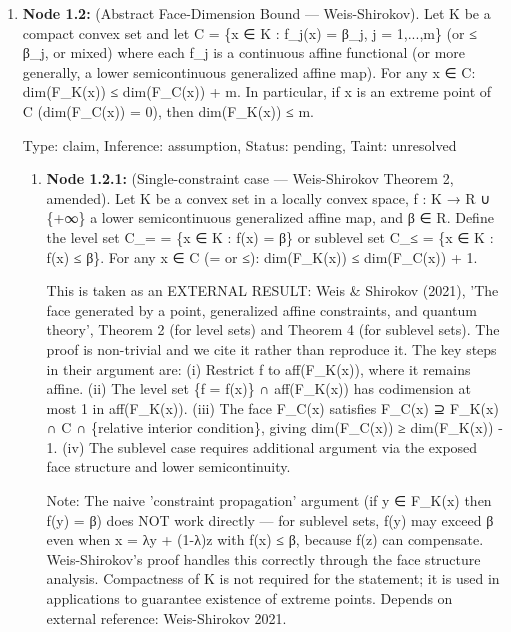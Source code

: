 \documentclass{article}
\begin{document}
\begin{enumerate}
\begin{enumerate}
Note: Faithfulness of f on π\_φ(A)'\textasciicircum{}+ (equivalently, ξ\_φ being separating for π\_φ(A)') is NOT required for this dimension formula — it suffices that f is a non-zero linear functional on V and the cone has interior. Faithfulness is used elsewhere (injectivity, Node 1.1.4).

Combining with Nodes 1.1.1–1.1.5: dim(F\_\{S(A)\}(φ)) = dim(D) = dim\_R(π\_φ(A)'\textasciicircum{}\{sa\}) - 1. This is a deduction depending on Nodes 1.1.1–1.1.5.

  Type: claim, Inference: assumption, Status: pending, Taint: unresolved

\end{enumerate}
\item \textbf{Node 1.2:} (Abstract Face-Dimension Bound — Weis-Shirokov). Let K be a compact convex set and let C = \{x ∈ K : f\_j(x) = β\_j, j = 1,...,m\} (or ≤ β\_j, or mixed) where each f\_j is a continuous affine functional (or more generally, a lower semicontinuous generalized affine map). For any x ∈ C: dim(F\_K(x)) ≤ dim(F\_C(x)) + m. In particular, if x is an extreme point of C (dim(F\_C(x)) = 0), then dim(F\_K(x)) ≤ m.

  Type: claim, Inference: assumption, Status: pending, Taint: unresolved

\begin{enumerate}
\item \textbf{Node 1.2.1:} (Single-constraint case — Weis-Shirokov Theorem 2, amended). Let K be a convex set in a locally convex space, f : K → R ∪ \{+∞\} a lower semicontinuous generalized affine map, and β ∈ R. Define the level set C\_= = \{x ∈ K : f(x) = β\} or sublevel set C\_≤ = \{x ∈ K : f(x) ≤ β\}. For any x ∈ C (= or ≤): dim(F\_K(x)) ≤ dim(F\_C(x)) + 1.

This is taken as an EXTERNAL RESULT: Weis \& Shirokov (2021), 'The face generated by a point, generalized affine constraints, and quantum theory', Theorem 2 (for level sets) and Theorem 4 (for sublevel sets). The proof is non-trivial and we cite it rather than reproduce it. The key steps in their argument are: (i) Restrict f to aff(F\_K(x)), where it remains affine. (ii) The level set \{f = f(x)\} ∩ aff(F\_K(x)) has codimension at most 1 in aff(F\_K(x)). (iii) The face F\_C(x) satisfies F\_C(x) ⊇ F\_K(x) ∩ C ∩ \{relative interior condition\}, giving dim(F\_C(x)) ≥ dim(F\_K(x)) - 1. (iv) The sublevel case requires additional argument via the exposed face structure and lower semicontinuity.

Note: The naive 'constraint propagation' argument (if y ∈ F\_K(x) then f(y) = β) does NOT work directly — for sublevel sets, f(y) may exceed β even when x = λy + (1-λ)z with f(x) ≤ β, because f(z) can compensate. Weis-Shirokov's proof handles this correctly through the face structure analysis. Compactness of K is not required for the statement; it is used in applications to guarantee existence of extreme points. Depends on external reference: Weis-Shirokov 2021.


\end{enumerate}
\end{enumerate}
\end{document}
